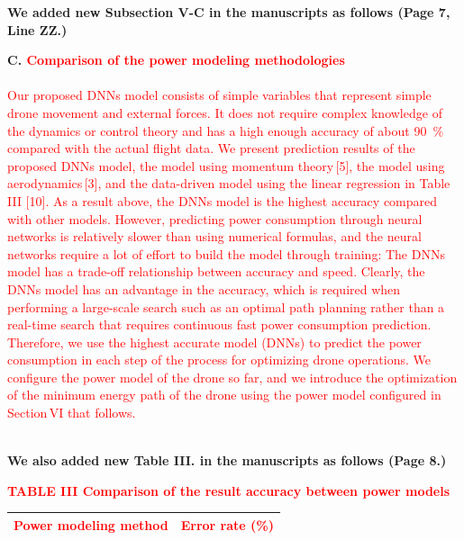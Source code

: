 \documentclass[onecolumn]{IEEEconf}
\begin{document}
\begin{description}
	\textbf{We added new Subsection V-C in the manuscripts as follows (Page 7, Line ZZ.)}\\
    \begin{mdframed}[ linewidth=.75pt, userdefinedwidth=0.9\textwidth]
    \textbf{C. \textcolor{red}{Comparison of the power modeling methodologies}}~\\
    ~\\
    \textcolor{red}{Our proposed DNNs model consists of simple variables that represent simple drone movement and external forces. It does not require complex knowledge of the dynamics or control theory and has a high enough accuracy of about 90~\% compared with the actual flight data.}
    \textcolor{red}{We present prediction results of the proposed DNNs model, the model using momentum theory\,[5], the model using aerodynamics\,[3], and the data-driven model using the linear regression in Table\,III [10].
    As a result above, the DNNs model is the highest accuracy compared with other models.
    However, predicting power consumption through neural networks is relatively slower than using numerical formulas, and the neural networks require a lot of effort to build the model through training: The DNNs model has a trade-off relationship between accuracy and speed.
    Clearly, the DNNs model has an advantage in the accuracy, which is required when performing a large-scale search such as an optimal path planning rather than a real-time search that requires continuous fast power consumption prediction.
    Therefore, we use the highest accurate model (DNNs) to predict the power consumption in each step of the process for optimizing drone operations.
    We configure the power model of the drone so far, and we introduce the optimization of the minimum energy path of the drone using the power model configured in Section\,VI that follows.}
    ~\\
    \end{mdframed}
    ~\\
    \textbf{We also added new Table III. in the manuscripts as follows (Page 8.)}\\
    \begin{mdframed}[ linewidth=.75pt, userdefinedwidth=0.9\textwidth]
    \centering
    \textcolor{red}{
    \textbf{TABLE III Comparison of the result accuracy between power models}~\\
    \begin{tabular}{|c|c|}
    \hline
    {Power modeling method} &  {Error rate (\%)} \\ \hline

\end{tabular}}
\end{mdframed}
\end{description}
\end{document}
